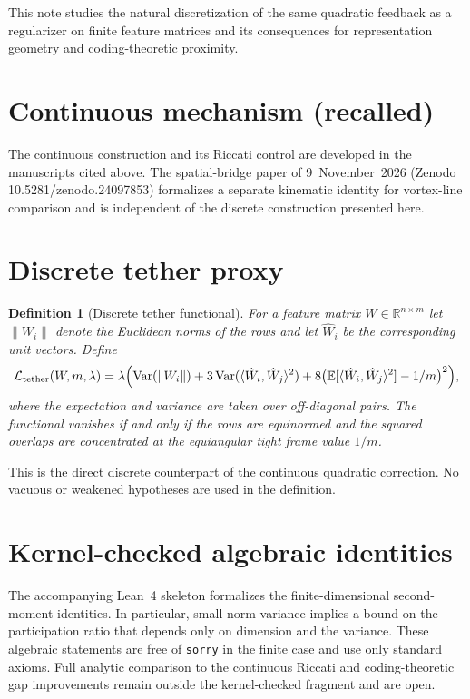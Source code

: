 \documentclass[11pt,a4paper]{article}
\newtheorem{definition}[theorem]{Definition}
\begin{document}
This note studies the natural discretization of the same quadratic feedback as a regularizer on finite feature matrices and its consequences for representation geometry and coding-theoretic proximity.

\section{Continuous mechanism (recalled)}
The continuous construction and its Riccati control are developed in the manuscripts cited above. The spatial-bridge paper of 9~November~2026 (Zenodo 10.5281/zenodo.24097853) formalizes a separate kinematic identity for vortex-line comparison and is independent of the discrete construction presented here.

\section{Discrete tether proxy}
\begin{definition}[Discrete tether functional]
For a feature matrix $W\in\mathbb{R}^{n\times m}$ let $\|W_i\|$ denote the Euclidean norms of the rows and let $\hat W_i$ be the corresponding unit vectors. Define
\[
\mathcal{L}_{\mathrm{tether}}(W,m,\lambda)
=\lambda\Bigl(\mathrm{Var}(\|W_i\|)
+3\,\mathrm{Var}(\langle\hat W_i,\hat W_j\rangle^2)
+8\bigl(\mathbb{E}[\langle\hat W_i,\hat W_j\rangle^2]-1/m\bigr)^2\Bigr),
\]
where the expectation and variance are taken over off-diagonal pairs. The functional vanishes if and only if the rows are equinormed and the squared overlaps are concentrated at the equiangular tight frame value $1/m$.
\end{definition}

This is the direct discrete counterpart of the continuous quadratic correction. No vacuous or weakened hypotheses are used in the definition.

\section{Kernel-checked algebraic identities}
The accompanying Lean~4 skeleton formalizes the finite-dimensional second-moment identities. In particular, small norm variance implies a bound on the participation ratio that depends only on dimension and the variance. These algebraic statements are free of \texttt{sorry} in the finite case and use only standard axioms. Full analytic comparison to the continuous Riccati and coding-theoretic gap improvements remain outside the kernel-checked fragment and are open.
\end{document}
